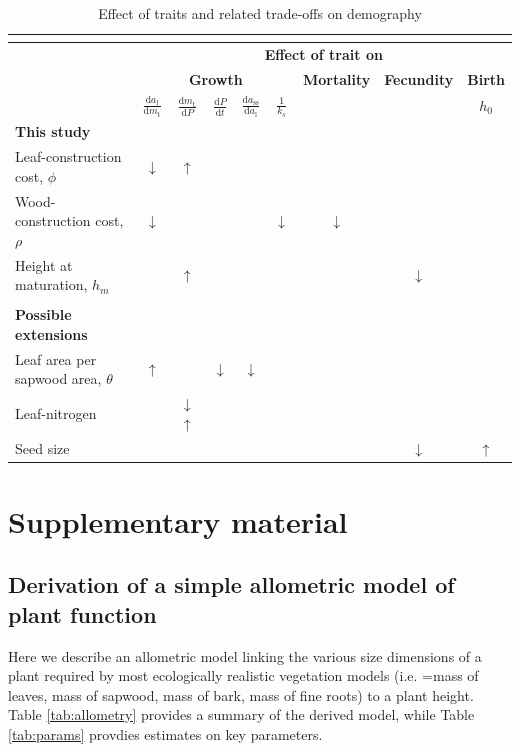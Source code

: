 \documentclass[12pt, a4paper]{article}
\begin{document}
\begin{table}[h]
\caption{Effect of traits and related trade-offs on demography}
\begin{tabular}[c]{l|ccccc|c|c|c}
\multicolumn{9}{c}{}\\ \hline
& \multicolumn{8}{c}{\textbf{Effect of trait on}}\\
& \multicolumn{5}{c|}{\textbf{Growth}} & \textbf{Mortality}& \textbf{Fecundity}& \textbf{Birth}\\
& $\frac{\textrm{d}a_\textrm{l}}{\textrm{d}m_\textrm{t}}$
& $\frac{\textrm{d}m_\textrm{t}}{\textrm{d}P}$
& $\frac{\textrm{d}P}{\textrm{d}t}$
& $\frac{\textrm{d}a_\textrm{ss}}{\textrm{d}a_\textrm{l}}$
& $\frac{1}{k_s}$ & & & $h_0$ \\\hline
\textbf{This study}&&&&&&&\\
Leaf-construction cost, $\phi$ & $\downarrow$ & $\uparrow$ & & & & & \\
Wood-construction cost, $\rho$ & $\downarrow$ &  & & & $\downarrow$ & $\downarrow$ & \\
Height at maturation, $h_m$ & &$\uparrow$ & & & & & $\downarrow$ & \\
&&&&&&&\\\hline
\textbf{Possible extensions}&&&&&&&\\
Leaf area per sapwood area, $\theta$ & $\uparrow$& & $\downarrow$ & $\downarrow$ & & &\\
Leaf-nitrogen & &$\downarrow$$\uparrow$ & & & & & \\
Seed size & & & & & & & $\downarrow$ & $\uparrow$\\ \hline
\end{tabular}
\label{tab:trade-offs}
\end{table}

\newpage

\section{Supplementary material}\label{supplementary-material}

\subsection{Derivation of a simple allometric model of plant
function}\label{derivation-of-a-simple-allometric-model-of-plant-function}

Here we describe an allometric model linking the various size dimensions
of a plant required by most ecologically realistic vegetation models
(i.e. =mass of leaves, mass of sapwood, mass of bark, mass of fine
roots) to a plant height. Table \ref{tab:allometry} provides a summary
of the derived model, while Table \ref{tab:params} provdies estimates on
key parameters.
\end{document}
